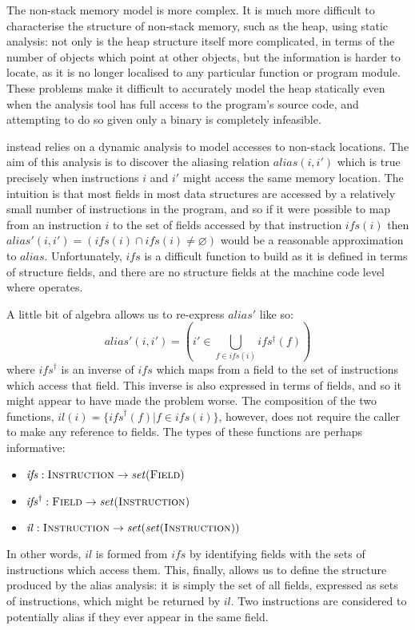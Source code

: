 The non-stack memory model is more complex.  It is much more difficult
to characterise the structure of non-stack memory, such as the heap,
using static analysis: not only is the heap structure itself more
complicated, in terms of the number of objects which point at other
objects, but the information is harder to locate, as it is no longer
localised to any particular function or program module.  These
problems make it difficult to accurately model the heap statically
even when the analysis tool has full access to the program's source
code\needCite{}, and attempting to do so given only a binary is
completely infeasible.

{\Technique} instead relies on a dynamic analysis to model accesses to
non-stack locations.  The aim of this analysis is to discover the
aliasing relation $\mathit{alias}(i, i')$ which is true precisely when
instructions $i$ and $i'$ might access the same memory location.  The
intuition is that most fields in most data structures are accessed by
a relatively small number of instructions in the program, and so if it
were possible to map from an instruction $i$ to the set of fields
accessed by that instruction $\mathit{ifs}(i)$ then
$\mathit{alias}'(i,i') = (\mathit{ifs}(i) \cap \mathit{ifs}(i) \not=
\varnothing)$ would be a reasonable approximation to $\mathit{alias}$.
Unfortunately, $\mathit{ifs}$ is a difficult function to build as it
is defined in terms of structure fields, and there are no structure
fields at the machine code level where {\technique} operates.

A little bit of algebra allows us to re-express $\mathit{alias}'$ like
so:
\begin{displaymath}
\mathit{alias}'(i, i') = \left(i' \in \bigcup_{f \in \mathit{ifs}(i)} \mathit{ifs^{\dagger}}(f)\right)
\end{displaymath}
where $\mathit{ifs}^{\dagger}$ is an inverse of $\mathit{ifs}$ which
maps from a field to the set of instructions which access that field.
This inverse is also expressed in terms of fields, and so it might
appear to have made the problem worse.  The composition of the two
functions, $\mathit{il}(i) = \{\mathit{ifs}^{\dagger}(f) | f \in
\mathit{ifs}(i)\}$, however, does not require the caller to make any
reference to fields.  The types of these functions are perhaps
informative:
\begin{itemize}
\item $\mathit{ifs}: \textsc{Instruction} \rightarrow \mathit{set}(\textsc{Field})$
\item $\mathit{ifs}^{\dagger}: \textsc{Field} \rightarrow \mathit{set}(\textsc{Instruction})$
\item $\mathit{il}: \textsc{Instruction} \rightarrow \mathit{set}(\mathit{set}(\textsc{Instruction}))$
\end{itemize}
In other words, $\mathit{il}$ is formed from $\mathit{ifs}$ by
identifying fields with the sets of instructions which access them.
This, finally, allows us to define the structure produced by the alias
analysis: it is simply the set of all fields, expressed as sets of
instructions, which might be returned by $\mathit{il}$.  Two
instructions are considered to potentially alias if they ever appear
in the same field.

